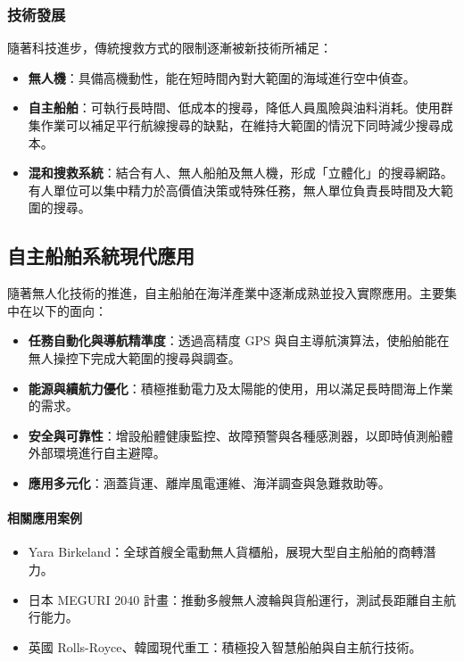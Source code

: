 \documentclass[12pt,a4paper]{article}
\begin{document}
\subsubsection{技術發展}
隨著科技進步，傳統搜救方式的限制逐漸被新技術所補足：
\begin{itemize}
  \item \textbf{無人機}：具備高機動性，能在短時間內對大範圍的海域進行空中偵查。
  \item \textbf{自主船舶}：可執行長時間、低成本的搜尋，降低人員風險與油料消耗。使用群集作業可以補足平行航線搜尋的缺點，在維持大範圍的情況下同時減少搜尋成本。
  \item \textbf{混和搜救系統}：結合有人、無人船舶及無人機，形成「立體化」的搜尋網路。有人單位可以集中精力於高價值決策或特殊任務，無人單位負責長時間及大範圍的搜尋。
\end{itemize}

\subsection{自主船舶系統現代應用}
隨著無人化技術的推進，自主船舶在海洋產業中逐漸成熟並投入實際應用。主要集中在以下的面向\cite{autoboat}：
\begin{itemize}
  \item \textbf{任務自動化與導航精準度}：透過高精度 GPS 與自主導航演算法，使船舶能在無人操控下完成大範圍的搜尋與調查。
  \item \textbf{能源與續航力優化}：積極推動電力及太陽能的使用，用以滿足長時間海上作業的需求。
  \item \textbf{安全與可靠性}：增設船體健康監控、故障預警與各種感測器，以即時偵測船體外部環境進行自主避障。
  \item \textbf{應用多元化}：涵蓋貨運、離岸風電運維、海洋調查與急難救助等。
\end{itemize}

\paragraph{相關應用案例}
\begin{itemize}
  \item Yara Birkeland：全球首艘全電動無人貨櫃船，展現大型自主船舶的商轉潛力\cite{Yara}。
  \item 日本 MEGURI 2040 計畫：推動多艘無人渡輪與貨船運行，測試長距離自主航行能力\cite{Meguri}。
  \item 英國 Rolls-Royce、韓國現代重工：積極投入智慧船舶與自主航行技術。
\end{itemize}
\end{document}
